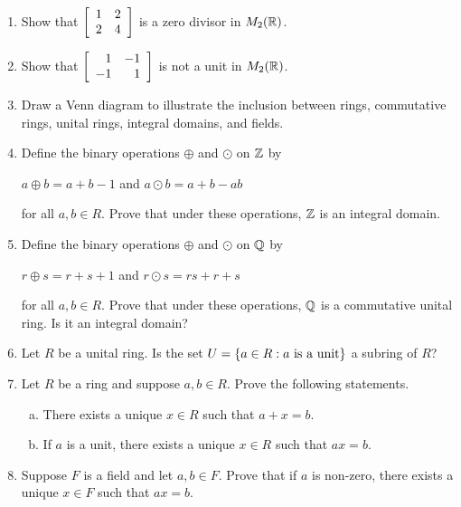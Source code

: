 \documentclass[11pt,fleqn,dvipsnames,usenames]{article}
\newcommand{\p}{\noindent}
\begin{document}
\begin{enumerate}[1.]
\item Show that $\MATRIX{rr}{1 & 2\\2 & 4}$ is a zero divisor in $M_{2}(\REAL)$.

\item Show that $\MATRIX{rr}{1 & -1\\-1 & 1}$ is not a unit in $M_{2}(\REAL)$.

\item Draw a Venn diagram to illustrate the inclusion between rings, commutative rings, unital rings, integral domains, and fields.

\item Define the binary operations $\oplus$ and $\odot$ on $\Z$ by
\begin{center}
$a\oplus b = a + b - 1$ and $a\odot b = a + b - ab$
\end{center}
for all $a,b\in R$.  Prove that under these operations, $\Z$ is an integral domain.

\item Define the binary operations $\oplus$ and $\odot$ on $\Q$ by
\begin{center}
$r\oplus s = r + s + 1$ and $r\odot s = rs + r + s$
\end{center}
for all $a,b\in R$.  Prove that under these operations, $\Q$ is a commutative unital ring.  Is it an integral domain?

\item Let $R$ be a unital ring.  Is the set $U = \SET{a\in R:a\text{ is a unit}}$ a subring of $R$?

\item Let $R$ be a ring and suppose $a,b\in R$.  Prove the following statements.
\begin{enumerate}[(a)]
\item There exists a unique $x\in R$ such that $a + x = b$.
\item If $a$ is a unit, there exists a unique $x\in R$ such that $ax=b$.   
\end{enumerate}

\item Suppose $F$ is a field and let $a,b\in F$.  Prove that if $a$ is non-zero, there exists a unique $x\in F$ such that $ax = b$.
\end{enumerate}
\newpage

\p {\huge \S4.6 Problems}
\vsp
\end{document}
